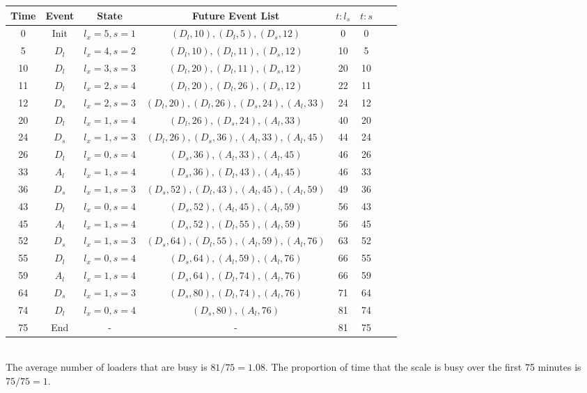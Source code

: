 \documentclass{article}
\begin{document}
\begin{enumerate}
\begin{enumerate}
\begin{tabular}{|c|c|c|c|c|c|c|c|}
\hline
Time & Event & State & Future Event List & $t:l_s$ & $t:s$ \\
\hline
0 & Init & $l_x=5, s=1$ & $(D_l,10), (D_l,5), (D_s,12)$ & 0 & 0 \\
5 & $D_l$ & $l_x=4, s=2$ & $(D_l,10), (D_l,11), (D_s,12)$ & 10 & 5 \\
10 & $D_l$ & $l_x=3, s=3$ & $(D_l,20), (D_l,11), (D_s,12)$ & 20 & 10 \\
11 & $D_l$ & $l_x=2, s=4$ & $(D_l,20), (D_l,26), (D_s,12)$ & 22 & 11 \\
12 & $D_s$ & $l_x=2, s=3$ & $(D_l,20), (D_l,26), (D_s,24), (A_l,33)$ & 24 & 12 \\
20 & $D_l$ & $l_x=1, s=4$ & $(D_l,26), (D_s,24), (A_l,33)$ & 40 & 20 \\
24 & $D_s$ & $l_x=1, s=3$ & $(D_l,26), (D_s,36), (A_l,33), (A_l,45)$ & 44 & 24 \\
26 & $D_l$ & $l_x=0, s=4$ & $(D_s,36), (A_l,33), (A_l,45)$ & 46 & 26 \\
33 & $A_l$ & $l_x=1, s=4$ & $(D_s,36), (D_l,43), (A_l,45)$ & 46 & 33 \\
36 & $D_s$ & $l_x=1, s=3$ & $(D_s,52), (D_l,43), (A_l,45), (A_l,59)$ & 49 & 36 \\
43 & $D_l$ & $l_x=0, s=4$ & $(D_s,52), (A_l,45), (A_l,59)$ & 56 & 43 \\
45 & $A_l$ & $l_x=1, s=4$ & $(D_s,52), (D_l,55), (A_l,59)$ & 56 & 45 \\
52 & $D_s$ & $l_x=1, s=3$ & $(D_s,64), (D_l,55), (A_l,59), (A_l,76)$ & 63 & 52 \\
55 & $D_l$ & $l_x=0, s=4$ & $(D_s,64), (A_l,59), (A_l,76)$ & 66 & 55 \\
59 & $A_l$ & $l_x=1, s=4$ & $(D_s,64), (D_l,74), (A_l,76)$ & 66 & 59 \\
64 & $D_s$ & $l_x=1, s=3$ & $(D_s,80), (D_l,74), (A_l,76)$ & 71 & 64 \\
74 & $D_l$ & $l_x=0, s=4$ & $(D_s,80), (A_l,76)$ & 81 & 74 \\
75 & End & - & - & 81 & 75 \\
\hline
\end{tabular}\\

The average number of loaders that are busy is $81/75=1.08$. The proportion of time that the scale is busy over the first 75 minutes is $75/75=1$.

    \end{enumerate}

\end{enumerate}
\end{document}
